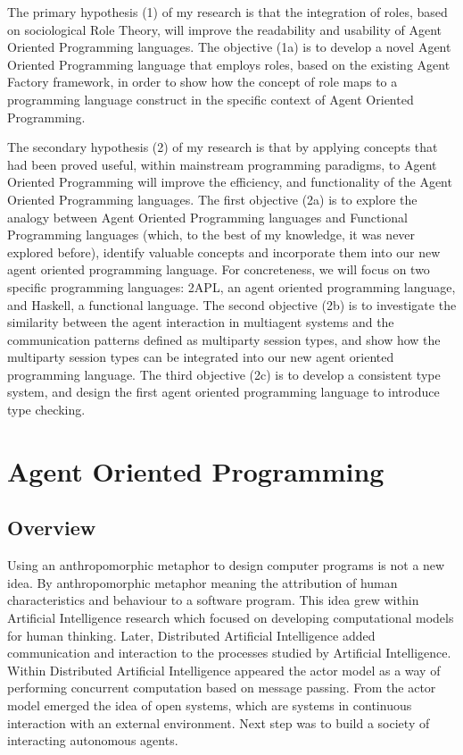 \documentclass[a4paper,12pt,oneside,fleqn]{book} %
\newcommand{\rg}[1]{\marginpar{\tiny\raggedright\textcolor{blue}{\bf rg:} #1}}
\renewcommand{\rg}{}
\begin{document}
The primary hypothesis (1) of my research is that the integration of roles,
based on sociological Role Theory, will improve the readability and
usability of Agent Oriented Programming languages. The objective (1a) is to
develop a novel Agent Oriented Programming language that employs roles,
based on the existing Agent Factory framework, in order to show how the
concept of role maps to a programming language construct in the specific
context of Agent Oriented Programming.

The secondary hypothesis (2) of my research is that by applying concepts
that had been proved useful, within mainstream programming paradigms, to
Agent Oriented Programming will improve the efficiency, and functionality
of the Agent Oriented Programming languages. The first objective (2a) is to
explore the analogy between Agent Oriented Programming languages and
Functional Programming languages (which, to the best of my knowledge, it
was never explored before), identify valuable concepts and incorporate them
into our new agent oriented programming language. For concreteness, we will
focus on two specific programming languages: 2APL, an agent oriented
programming language, and Haskell, a functional language. The second
objective (2b) is to investigate the similarity between the agent
interaction in multiagent systems and the communication patterns defined as
multiparty session types, and show how the multiparty session types can be
integrated into our new agent oriented programming language. The third
objective (2c) is to develop a consistent type system, and design the first
agent oriented programming language to introduce type checking.



\chapter{Agent Oriented Programming}\label{ch:aop} %
\section{Overview} %

Using an anthropomorphic metaphor to design computer programs is not a new
idea. By anthropomorphic metaphor meaning the attribution of human
characteristics and behaviour to a software program. This idea grew within
Artificial Intelligence research which focused on developing computational
models for human thinking. Later, Distributed Artificial Intelligence added
communication and interaction to the processes studied by Artificial
Intelligence.  Within Distributed Artificial Intelligence appeared the
actor model as a way of performing concurrent computation based on message
passing. From the actor model emerged the idea of open systems, which are
systems in continuous interaction with an external environment. Next step
was to build a society of interacting autonomous agents.
\end{document}
